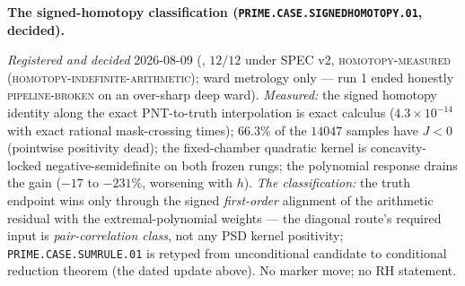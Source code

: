 \par\smallskip\noindent\textbf{The signed-homotopy
classification
(\texttt{PRIME.CASE.\allowbreak SIGNEDHOMOTOPY.01}, decided).}
{\sloppy
\emph{Registered and decided} 2026-08-09
(, $12/12$ under SPEC v2,
\textsc{homotopy-measured (homotopy-indefinite-arithmetic)};
ward metrology only --- run 1 ended honestly
\textsc{pipeline-broken} on an over-sharp deep ward).
\emph{Measured:} the signed homotopy identity along the exact
PNT-to-truth interpolation is exact calculus
($4.3\times10^{-14}$ with exact rational mask-crossing times);
$66.3\%$ of the $14047$ samples have $J < 0$ (pointwise
positivity dead); the fixed-chamber quadratic kernel is
concavity-locked negative-semidefinite on both frozen rungs;
the polynomial response drains the gain ($-17$ to $-231\%$,
worsening with $h$).  \emph{The classification:} the truth
endpoint wins only through the signed \emph{first-order}
alignment of the arithmetic residual with the
extremal-polynomial weights --- the diagonal route's required
input is \emph{pair-correlation class}, not any PSD kernel
positivity; \texttt{PRIME.CASE.SUMRULE.01} is retyped from
unconditional candidate to conditional reduction theorem (the
dated update above).  No marker move; no RH statement.\par}


